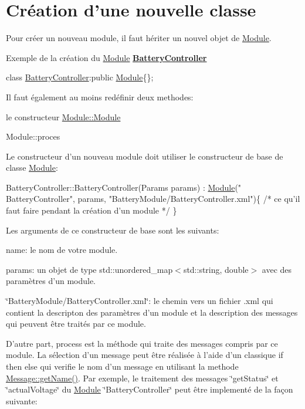 \hypertarget{docModule_classCreation}{}\section{Création d'une nouvelle classe}\label{docModule_classCreation}
Pour créer un nouveau module, il faut hériter un nouvel objet de \hyperlink{classModule}{Module}.

Exemple de la création du \hyperlink{classModule}{Module} {\bfseries \hyperlink{classBatteryController}{Battery\-Controller}}

{\ttfamily class \hyperlink{classBatteryController}{Battery\-Controller}\-:public \hyperlink{classModule}{Module}\{\};}

Il faut également au moins redéfinir deux methodes\-:
\begin{DoxyEnumerate}
\item le constructeur \hyperlink{classModule_abcdd948c7444d3420f04be1bd332fbae}{Module\-::\-Module}
\item Module\-::proces
\end{DoxyEnumerate}

Le constructeur d'un nouveau module doit utiliser le constructeur de base de classe \hyperlink{classModule}{Module}\-:


\begin{DoxyCode}
BatteryController::BatteryController(Params params) : \hyperlink{classModule}{Module}(\textcolor{stringliteral}{"
      BatteryController"}, params, \textcolor{stringliteral}{"BatteryModule/BatteryController.xml"})\{
    \textcolor{comment}{/* ce qu'il faut faire pendant la création d'un module */}
\}
\end{DoxyCode}


Les arguments de ce constructeur de base sont les suivants\-:
\begin{DoxyEnumerate}
\item name\-: le nom de votre module.
\item params\-: un objet de type {\ttfamily std\-::unordered\-\_\-map$<$std\-::string, double$>$} avec des paramètres d'un module.
\item \char`\"{}\-Battery\-Module/\-Battery\-Controller.\-xml\char`\"{}\-: le chemin vers un fichier {\ttfamily .xml} qui contient la descripton des paramètres d'un module et la description des messages qui peuvent être traités par ce module.
\end{DoxyEnumerate}

D'autre part, process est la méthode qui traite des messages compris par ce module. La sélection d'un message peut être réalisée à l'aide d'un classique {\ttfamily if then else} qui verifie le nom d'un message en utilisant la methode \hyperlink{classMessage_a9134dbb49e75c4a4b8862afca70a78b9}{Message\-::get\-Name()}. Par exemple, le traitement des messages \char`\"{}get\-Status\char`\"{} et \char`\"{}actual\-Voltage\char`\"{} du \hyperlink{classModule}{Module} \char`\"{}\-Battery\-Controller\char`\"{} peut être implementé de la façon suivante\-:


